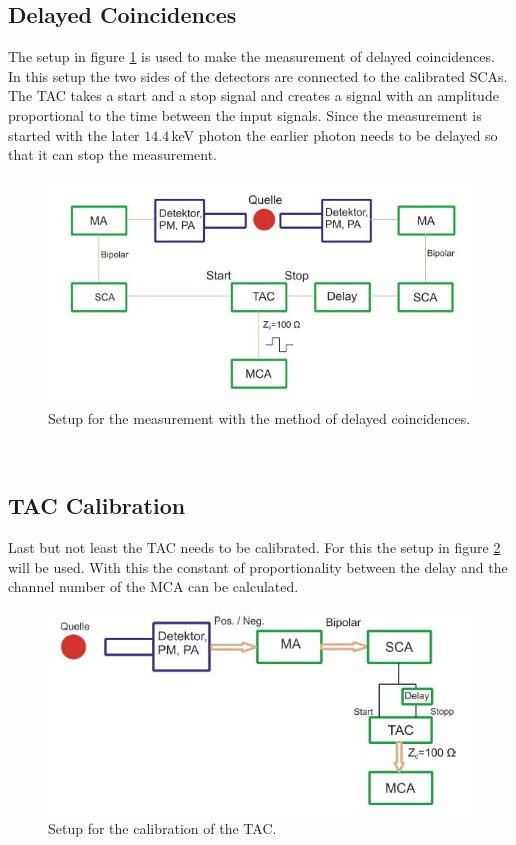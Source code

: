 \documentclass[30pt,a4paper]{article}
\begin{document}
 	\subsection{Delayed Coincidences}
 	The setup in figure \ref{setup_DC} is used to make the measurement of delayed coincidences. In this setup the two sides of the detectors are connected to the calibrated SCAs. The TAC takes a start and a stop signal and creates a signal with an amplitude proportional to the time between the input signals. Since the measurement is started with the later $14.4$\,keV photon the earlier photon needs to be delayed so that it can stop the measurement.\cite{Anleitung}
 	\begin{figure}[h]
 		\includegraphics{Bilder/Circuit_DC}
 		\centering
 		\caption{\small Setup for the measurement with the method of delayed coincidences. \cite{Anleitung}}
 		\label{setup_DC}
 	\end{figure}\\
 	\subsection{TAC Calibration}
 	Last but not least the TAC needs to be calibrated. For this the setup in figure \ref{setup_TC} will be used. With this the constant of proportionality between the delay and the channel number of the MCA can be calculated. \cite{Anleitung}
 	\begin{figure}[h]
 		\includegraphics{Bilder/Circuit_DC_calib}
 		\centering
 		\caption{\small Setup for the calibration of the TAC. \cite{Anleitung}}
 		\label{setup_TC}
 	\end{figure}\\
\end{document}

